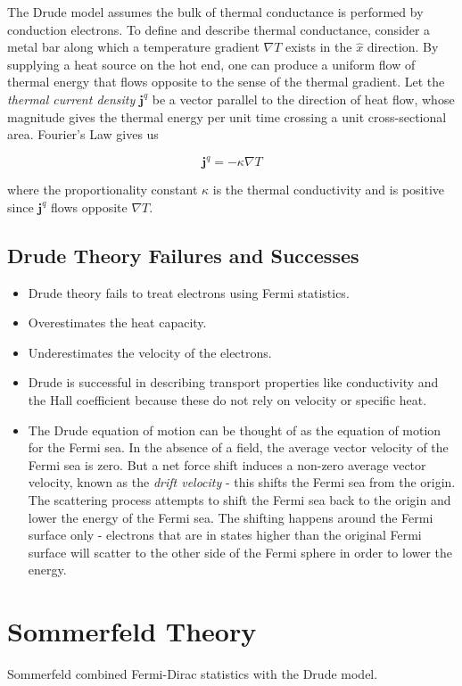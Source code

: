 \documentclass[10pt]{article}
\begin{document}
The Drude model assumes the bulk of thermal conductance is performed by conduction electrons. To define and describe thermal conductance, consider a metal bar
along which a temperature gradient $\nabla T$ exists in the $\hat{x}$ direction. By supplying a heat source on the hot end, one can produce a uniform flow of thermal
energy that flows opposite to the sense of the thermal gradient. Let the \emph{thermal current density} $\textbf{j}^{q}$ be a vector parallel to the direction of heat flow,
whose magnitude gives the thermal energy per unit time crossing a unit cross-sectional area. Fourier's Law gives us

$$\textbf{j}^{q} = -\kappa \nabla T$$

where the proportionality constant $\kappa$ is the thermal conductivity and is positive since $\textbf{j}^{q}$ flows opposite $\nabla T$.

\subsection{Drude Theory Failures and Successes}
\begin{itemize}
  \item Drude theory fails to treat electrons using Fermi statistics.
  \item Overestimates the heat capacity.
  \item Underestimates the velocity of the electrons.
  \item Drude is successful in describing transport properties like conductivity and the Hall coefficient because
  these do not rely on velocity or specific heat.
  \item The Drude equation of motion can be thought of as the equation of motion for the Fermi sea. In the absence of a field, the
  average vector velocity of the Fermi sea is zero. But a net force shift induces a non-zero average vector velocity, known as the
  \emph{drift velocity} - this shifts the Fermi sea from the origin. The scattering process attempts to shift the Fermi sea back to the
  origin and lower the energy of the Fermi sea. The shifting happens around the Fermi surface only - electrons that are in states higher
  than the original Fermi surface will scatter to the other side of the Fermi sphere in order to lower the energy.
\end{itemize}

\section{Sommerfeld Theory}
Sommerfeld combined Fermi-Dirac statistics with the Drude model.
\end{document}

